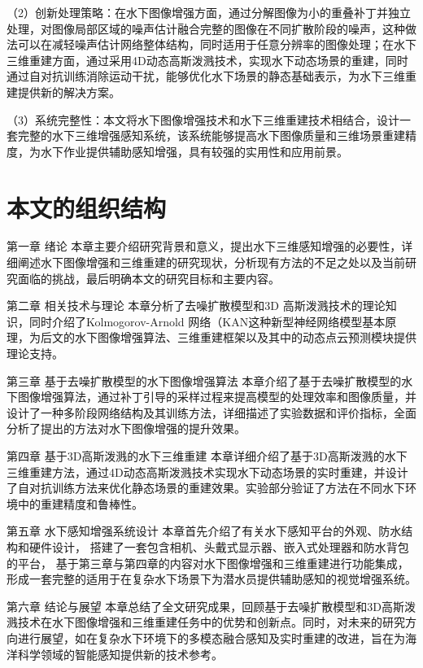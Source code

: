 （2）创新处理策略：在水下图像增强方面，通过分解图像为小的重叠补丁并独立处理，对图像局部区域的噪声估计融合完整的图像在不同扩散阶段的噪声，这种做法可以在减轻噪声估计网络整体结构，同时适用于任意分辨率的图像处理；在水下三维重建方面，通过采用4D动态高斯泼溅技术，实现水下动态场景的重建，同时通过自对抗训练消除运动干扰，能够优化水下场景的静态基础表示，为水下三维重建提供新的解决方案。

（3）系统完整性：本文将水下图像增强技术和水下三维重建技术相结合，设计一套完整的水下三维增强感知系统，该系统能够提高水下图像质量和三维场景重建精度，为水下作业提供辅助感知增强，具有较强的实用性和应用前景。

\section{本文的组织结构}
第一章 绪论
本章主要介绍研究背景和意义，提出水下三维感知增强的必要性，详细阐述水下图像增强和三维重建的研究现状，分析现有方法的不足之处以及当前研究面临的挑战，最后明确本文的研究目标和主要内容。

第二章 相关技术与理论
本章分析了去噪扩散模型和3D 高斯泼溅技术的理论知识，同时介绍了Kolmogorov-Arnold 网络（KAN这种新型神经网络模型基本原理，为后文的水下图像增强算法、三维重建框架以及其中的动态点云预测模块提供理论支持。

第三章 基于去噪扩散模型的水下图像增强算法
本章介绍了基于去噪扩散模型的水下图像增强算法，通过补丁引导的采样过程来提高模型的处理效率和图像质量，并设计了一种多阶段网络结构及其训练方法，详细描述了实验数据和评价指标，全面分析了提出的方法对水下图像增强的提升效果。

第四章 基于3D高斯泼溅的水下三维重建
本章详细介绍了基于3D高斯泼溅的水下三维重建方法，通过4D动态高斯泼溅技术实现水下动态场景的实时重建，并设计了自对抗训练方法来优化静态场景的重建效果。实验部分验证了方法在不同水下环境中的重建精度和鲁棒性。

第五章 水下感知增强系统设计
本章首先介绍了有关水下感知平台的外观、防水结构和硬件设计，
搭建了一套包含相机、头戴式显示器、嵌入式处理器和防水背包的平台，
基于第三章与第四章的内容对水下图像增强和三维重建进行功能集成，
形成一套完整的适用于在复杂水下场景下为潜水员提供辅助感知的视觉增强系统。



第六章 结论与展望
本章总结了全文研究成果，回顾基于去噪扩散模型和3D高斯泼溅技术在水下图像增强和三维重建任务中的优势和创新点。同时，对未来的研究方向进行展望，如在复杂水下环境下的多模态融合感知及实时重建的改进，旨在为海洋科学领域的智能感知提供新的技术参考。
